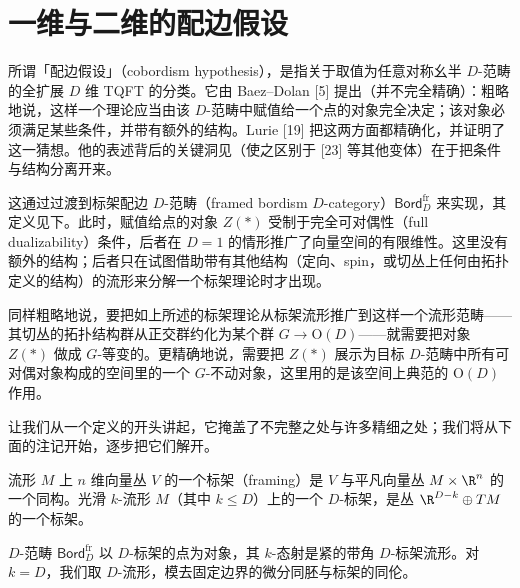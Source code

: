 
\section{一维与二维的配边假设}

所谓「配边假设」（cobordism hypothesis），是指关于取值为任意对称幺半 $D$-范畴的全扩展 $D$ 维 TQFT 的分类。它由 Baez--Dolan [5] 提出（并不完全精确）：粗略地说，这样一个理论应当由该 $D$-范畴中赋值给一个点的对象完全决定；该对象必须满足某些条件，并带有额外的结构。Lurie [19] 把这两方面都精确化，并证明了这一猜想。他的表述背后的关键洞见（使之区别于 [23] 等其他变体）在于把条件与结构分离开来。

这通过过渡到标架配边 $D$-范畴（framed bordism $D$-category）$\mathsf{Bord}^{\mathrm{fr}}_D$ 来实现，其定义见下。此时，赋值给点的对象 $Z(*)$ 受制于完全可对偶性（full dualizability）条件，后者在 $D=1$ 的情形推广了向量空间的有限维性。这里没有额外的结构；后者只在试图借助带有其他结构（定向、spin，或切丛上任何由拓扑定义的结构）的流形来分解一个标架理论时才出现。

同样粗略地说，要把如上所述的标架理论从标架流形推广到这样一个流形范畴——其切丛的拓扑结构群从正交群约化为某个群 $G\to\mathrm{O}(D)$——就需要把对象 $Z(*)$ 做成 $G$-等变的。更精确地说，需要把 $Z(*)$ 展示为目标 $D$-范畴中所有可对偶对象构成的空间里的一个 $G$-不动对象，这里用的是该空间上典范的 $\mathrm{O}(D)$ 作用。

让我们从一个定义的开头讲起，它掩盖了不完整之处与许多精细之处；我们将从下面的注记开始，逐步把它们解开。

\begin{definition}\label{def:3.4.1}
流形 $M$ 上 $n$ 维向量丛 $V$ 的一个标架（framing）是 $V$ 与平凡向量丛 $M\times\R^n$ 的一个同构。光滑 $k$-流形 $M$（其中 $k\le D$）上的一个 $D$-标架，是丛 $\R^{D-k}\oplus TM$ 的一个标架。
\end{definition}

$D$-范畴 $\mathsf{Bord}^{\mathrm{fr}}_D$ 以 $D$-标架的点为对象，其 $k$-态射是紧的带角 $D$-标架流形。对 $k=D$，我们取 $D$-流形，模去固定边界的微分同胚与标架的同伦。

